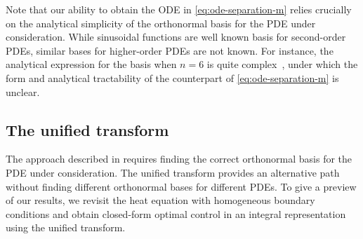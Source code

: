 \documentclass[journal,twoside,web]{ieeecolor}
\newtheorem{remark}{Remark}
\begin{document}
Note that our ability to obtain the ODE in \eqref{eq:ode-separation-m} relies crucially on the analytical simplicity of the orthonormal basis for the PDE under consideration. While sinusoidal functions are well known basis for second-order PDEs, similar bases for higher-order PDEs are not known.  
For instance, the analytical expression for the basis when $n=6$ is quite complex~\cite{papanicolaou2023orthonormal}, under which the form and analytical tractability of the counterpart of \eqref{eq:ode-separation-m} is unclear.


\subsection{The unified transform} 
The approach described in  requires finding the correct orthonormal basis for the PDE under consideration.
The unified transform provides an alternative path without finding different orthonormal bases for different PDEs.
To give a preview of our results, we revisit the heat equation with homogeneous boundary conditions and obtain closed-form optimal control in an integral representation using the unified transform. 
\end{document}
